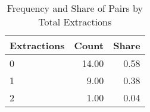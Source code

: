 \begin{table}[ht]
\centering
\begin{tabular}{lrr}
  \hline
Extractions & Count & Share \\ 
  \hline
0 & 14.00 & 0.58 \\ 
  1 & 9.00 & 0.38 \\ 
  2 & 1.00 & 0.04 \\ 
   \hline
\end{tabular}
\caption{Frequency and Share of Pairs by Total Extractions} 
\end{table}


